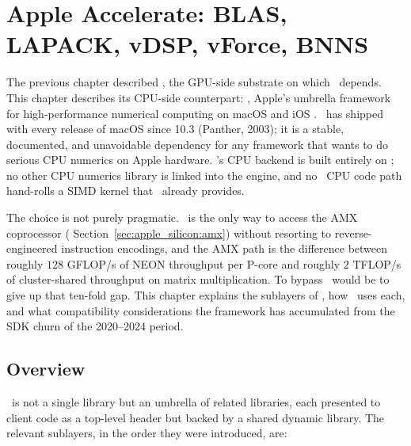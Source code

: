 \chapter{Apple Accelerate: BLAS, LAPACK, vDSP, vForce, BNNS}
\label{ch:accelerate}

The previous chapter described \MLX, the GPU-side substrate on which
\Lucid\ depends. This chapter describes its CPU-side counterpart:
\Accelerate, Apple's umbrella framework for high-performance
numerical computing on macOS and iOS \cite{apple_accelerate}.
\Accelerate\ has shipped with every release of macOS since 10.3
(Panther, 2003); it is a stable, documented, and unavoidable
dependency for any framework that wants to do serious CPU numerics
on Apple hardware. \Lucid's CPU backend
is built entirely on \Accelerate; no other CPU numerics library is
linked into the engine, and no \Lucid\ CPU code path hand-rolls a
SIMD kernel that \Accelerate\ already provides.

The choice is not purely pragmatic. \Accelerate\ is the only way to
access the AMX coprocessor (
Section~\ref{sec:apple_silicon:amx}) without resorting to
reverse-engineered instruction encodings, and the AMX path is the
difference between roughly $128$ GFLOP/s of NEON throughput per
P-core and roughly $2$ TFLOP/s of cluster-shared throughput on
matrix multiplication. To bypass \Accelerate\ would be to give up
that ten-fold gap. This chapter explains the sublayers of
\Accelerate, how \Lucid\ uses each, and what compatibility
considerations the framework has accumulated from the SDK churn of
the 2020--2024 period.

\section{Overview}
\label{sec:accelerate:overview}

\Accelerate\ is not a single library but an umbrella of related
libraries, each presented to client code as a top-level header but
backed by a shared dynamic library. The relevant sublayers, in the
order they were introduced, are:

